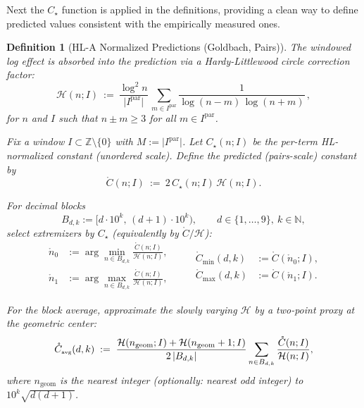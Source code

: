 \documentclass[11pt]{article}
\DeclarePairedDelimiter{\card}{\lvert}{\rvert}
\theoremstyle{inline}
\theoremstyle{break}
\theoremstyle{break}
\theoremstyle{break}
\theoremstyle{break}
\theoremstyle{break}
\theoremstyle{break}
\theoremstyle{break}
\newtheorem{definition}{Definition}
\theoremstyle{inline}
\newcommand{\tavg}{{\scriptscriptstyle\mathrm{avg}}}
\newcommand{\Cpred}{\mathring{C}}   %
\newcommand{\Npred}{\mathring{n}}   %
\newcommand{\Ipar}{I^{\mathrm{par}}}
\newcommand{\Ngeom}{n_\mathrm{geom}}
\newcommand{\HLCorr}{\mathcal{H}}
\begin{document}
Next the \( C_\star \) function is applied in the definitions, providing a clean way to define predicted values consistent with the empirically measured ones.

\begin{definition}[HL-A Normalized Predictions (Goldbach, Pairs)]
The windowed log effect is absorbed into the prediction via a Hardy-Littlewood circle correction factor:
\begin{equation}
\HLCorr(n;I)\ :=\ \frac{\log^2 n}{\lvert \Ipar\rvert}\,
\sum_{m\in \Ipar}\frac{1}{\log(n-m)\,\log(n+m)}\,,
\end{equation}
for \(n\) and \(I\) such that \(n\pm m\ge 3\) for all \(m\in\Ipar\).

Fix a window \(I\subset\mathbb Z\setminus\{0\}\) with \(M:=\lvert\Ipar\rvert\).
Let \(C_\star(n;I)\) be the per-term HL-normalized constant (unordered scale).
Define the \emph{predicted (pairs-scale) constant} by
\begin{equation}
\Cpred(n;I)\ :=\ 2\,C_\star(n;I)\,\HLCorr(n;I).
\end{equation}

For decimal blocks
\begin{equation}
B_{d,k}:=\big[d\cdot10^k,\,(d+1)\cdot10^k\big),\qquad d\in\{1,\dots,9\},\ k\in\mathbb N,
\end{equation}
select extremizers by \(C_\star\) (equivalently by \(\Cpred/\HLCorr\)):
\begin{equation}
\begin{aligned}
\Npred_0 &:= \arg\min_{n\in B_{d,k}} \frac{\Cpred(n;I)}{\HLCorr(n;I)}, \\
\Npred_1 &:= \arg\max_{n\in B_{d,k}} \frac{\Cpred(n;I)}{\HLCorr(n;I)},
\end{aligned}
\qquad
\begin{aligned}
\Cpred_{\min}(d,k) &:= \Cpred(\Npred_0;I),\\
\Cpred_{\max}(d,k) &:= \Cpred(\Npred_1;I).
\end{aligned}
\end{equation}

For the block average, approximate the slowly varying \(\HLCorr\) by a two-point
proxy at the geometric center:
\begin{equation}
\Cpred_{\tavg}(d,k)
\;:=\;
\frac{\HLCorr(\Ngeom;I)+\HLCorr(\Ngeom+1;I)}{2\,\card{B_{d,k}}}
\sum_{n\in B_{d,k}} \frac{\Cpred(n;I)}{\HLCorr(n;I)},
\end{equation}
where \(\Ngeom\) is the nearest integer (optionally: nearest \emph{odd} integer) to \(10^k\sqrt{d(d+1)}\).
\end{definition}
\end{document}
